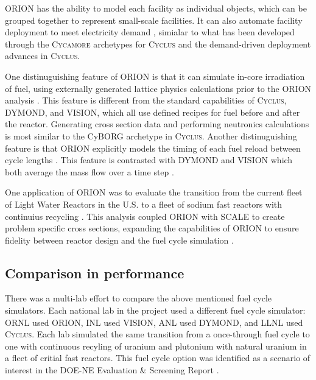 \documentclass{article}
\newcommand{\Cyclus}{\textsc{Cyclus}\xspace}%
\newcommand{\Cycamore}{\textsc{Cycamore}\xspace}%
\begin{document}
    ORION has the ability to model each facility 
    as individual objects, which can be grouped together to represent small-scale 
    facilities. It can also automate facility deployment to meet electricity demand
    \cite{feng_standardized_2016}, simialar to what has been developed through 
    the \Cycamore archetypes for \Cyclus \cite{scopatz_cyclus_2015} and 
    the demand-driven deployment advances in \Cyclus \cite{chee_demand-driven_2020}.  
    
    One distinuguishing feature of ORION is that 
    it can simulate in-core irradiation of fuel, using externally 
    generated lattice physics calculations prior to the ORION analysis
    \cite{feng_standardized_2016}. This feature is different from the standard 
    capabilities of \Cyclus, \gls{DYMOND}, and \gls{VISION}, which all use defined 
    recipes for fuel before and after the reactor. Generating cross section 
    data and performing neutronics calculations is most similar to 
    the CyBORG archetype in \Cyclus \cite{skutnik_cyborg:_2016}. Another 
    distinuguishing feature is that ORION explicitly models the timing of 
    each fuel reload between cycle lengths \cite{feng_standardized_2016}.
    This feature is contrasted with \gls{DYMOND} and \gls{VISION} which both average
    the mass flow over a time step \cite{feng_standardized_2016}.

    One application of ORION was to evaluate the transition from the current fleet of 
    Light Water Reactors in the U.S. to a fleet of sodium fast reactors with 
    continuius recycling \cite{sunny_transition_2015}. This analysis coupled 
    ORION with SCALE to create problem specific cross sections, expanding the 
    capabilities of ORION to ensure fidelity between reactor design and 
    the fuel cycle simulation \cite{sunny_transition_2015}. 
    
\subsection{Comparison in performance}
    There was a multi-lab effort to compare the above mentioned fuel cycle 
    simulators. Each national lab in the project used a different 
    fuel cycle simulator: \gls{ORNL} used ORION, \gls{INL} used 
    \gls{VISION}, \gls{ANL} used \gls{DYMOND}, and \gls{LLNL} used
    \Cyclus. Each lab simulated the same transition from a once-through 
    fuel cycle to one with continuous recyling of uranium and plutonium 
    with natural uranium in a fleet of critial fast reactors. This 
    fuel cycle option was identified as a scenario of interest in the 
    \gls{DOE-NE} Evaluation \& Screening Report \cite{wigeland_nuclear_2014}.
    
\end{document}
